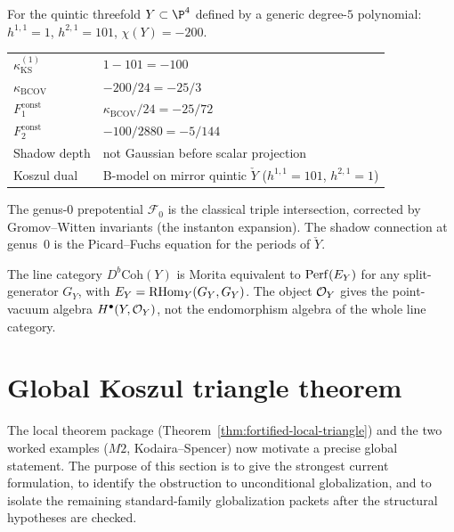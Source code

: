 \begin{computation}
For the quintic threefold $Y\subset\P^4$ defined by a
generic degree-$5$ polynomial:
$h^{1,1}=1$, $h^{2,1}=101$, $\chi(Y)=-200$.
\begin{center}
\renewcommand{\arraystretch}{1.2}
\begin{tabular}{ll}
$\kappa_{\mathrm{KS}}^{(1)}$ & $1-101=-100$ \\
$\kappa_{\mathrm{BCOV}}$ & $-200/24=-25/3$ \\
$F_1^{\mathrm{const}}$ & $\kappa_{\mathrm{BCOV}}/24=-25/72$ \\
$F_2^{\mathrm{const}}$ & $-100/2880=-5/144$ \\
Shadow depth & not Gaussian before scalar projection \\
Koszul dual & B-model on mirror quintic $\check{Y}$
($h^{1,1}=101$, $h^{2,1}=1$)
\end{tabular}
\end{center}
The genus-$0$ prepotential $\mathcal{F}_0$ is the classical
triple intersection, corrected by Gromov--Witten invariants
(the instanton expansion). The shadow connection at genus~$0$
is the Picard--Fuchs equation for the periods of $\check{Y}$.

The line category $D^b\mathrm{Coh}(Y)$ is Morita equivalent to
$\operatorname{Perf}(E_Y)$ for any split-generator $G_Y$, with
$E_Y=\operatorname{RHom}_Y(G_Y,G_Y)$. The object $\mathcal O_Y$ gives the point-vacuum
algebra $H^\bullet(Y,\mathcal O_Y)$, not the endomorphism algebra of the
whole line category.
\end{computation}



\section{Global Koszul triangle theorem}

The local theorem package (Theorem~\ref{thm:fortified-local-triangle})
and the two worked examples ($M2$, Kodaira--Spencer) now motivate
a precise global statement. The purpose of this section is to
give the strongest current formulation, to identify the
obstruction to unconditional globalization, and to isolate the
remaining standard-family globalization packets after the
structural hypotheses are checked.

